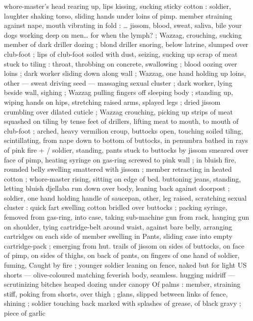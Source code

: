 whore-master's head rearing up, lips kissing, sucking sticky cotton : 
soldier, laughter shaking torso, sliding hands under loins of pimp. 
member straining against nape, mouth vibrating in fold : {\ldots} {\gl} jissom, 
blood, sweat, saliva, bile{\td} your dogs working deep on men{\ldots} for 
when the lymph?{\td} {\gr} ; Wazzag, crouching, sucking member of dark 
driller dozing ; blond driller snoring, below latrine, slumped over 
club-foot ; lips of club-foot soiled with dust, seizing, sucking up 
scrap of meat stuck to tiling : throat, throbbing on concrete, 
swallowing ; blood oozing over loins ; dark worker sliding down along 
wall ; Wazzag, one hand holding up loins, other --- sweat driving 
seed --- massaging sexual cluster ; dark worker, lying beside wall, 
sighing ; Wazzag pulling fingers off sleeping body ; standing up, 
wiping hands on hips, stretching raised arms, splayed legs ; dried 
jissom crumbling over dilated cuticle ; Wazzag crouching, picking up 
strips of meat squashed on tiling by tense feet of drillers, lifting 
meat to mouth, to mouth of club-foot ; arched, heavy vermilion 
croup, buttocks open, touching soiled tiling, scintillating, from nape 
down to bottom of buttocks, in penumbra bathed in rays of pink fire 
+ {\slash} soldier, standing, pants stuck to buttocks by jissom smeared over 
face of pimp, heating syringe on gas-ring screwed to pink wall ; in 
bluish fire, rounded belly swelling smattered with jissom ; member 
retracting in heated cotton ; whore-master rising, sitting on edge of 
bed. buttoning jeans, standing, letting bluish djellaba run down over 
body, leaning back against doorpost ; soldier, one hand holding 
handle of saucepan, other, leg raised, scratching sexual cluster : 
quick fart swelling cotton bridled over buttocks ; packing syringe, 
femoved from gas-ring, into case, taking sub-machine gun from rack, 
hanging gun on shoulder, tying cartridge-belt around waist, against 
bare belly, arranging cartridges on each side of member swelling in 
Pants, sliding case into empty cartridge-pack ; emerging from hut. 
trails of jissom on sides of buttocks, on face of pimp, on sides of 
thighs, on back of pants, on fingers of one hand of soldier, fuming, 
Caught by fire ; younger soldier leaning on fence, naked but for light 
US shorts --- olive-coloured matching feverish body, seamless. 
hugging midriff --- scrutinizing bitches heaped dozing under canopy 
Of palms : member, straining stiff, poking from shorts, over thigh ; 
glans, slipped between links of fence, shining ; soldier touching back 
marked with splashes of grease, of black gravy ; piece of garlic 
